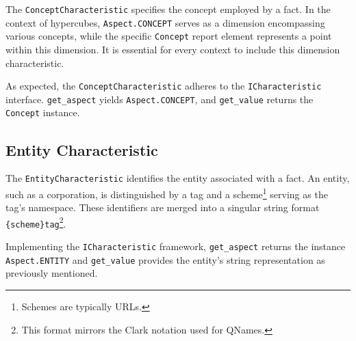 The \texttt{ConceptCharacteristic} specifies the concept employed by a fact.
In the context of hypercubes, \texttt{Aspect.CONCEPT} serves as a dimension encompassing various concepts,
while the specific \texttt{Concept} report element represents a point within this dimension.
It is essential for every context to include this dimension characteristic.

As expected, the \texttt{ConceptCharacteristic} adheres to the \texttt{ICharacteristic} interface.
\texttt{get\_aspect} yields \texttt{Aspect.CONCEPT}, and \texttt{get\_value} returns the \texttt{Concept} instance.



\subsection{Entity Characteristic}

The \texttt{EntityCharacteristic} identifies the entity associated with a fact.
An entity, such as a corporation, is distinguished by a tag and a scheme\footnote{Schemes are typically URLs.} serving as the tag's namespace.
These identifiers are merged into a singular string format \texttt{\{scheme\}tag}\footnote{This format mirrors the Clark notation used for QNames\cite{w3_qnames}.}.

Implementing the \texttt{ICharacteristic} framework,
\texttt{get\_aspect} returns the instance \texttt{Aspect.ENTITY} and \texttt{get\_value} provides the entity's string representation as previously mentioned.


